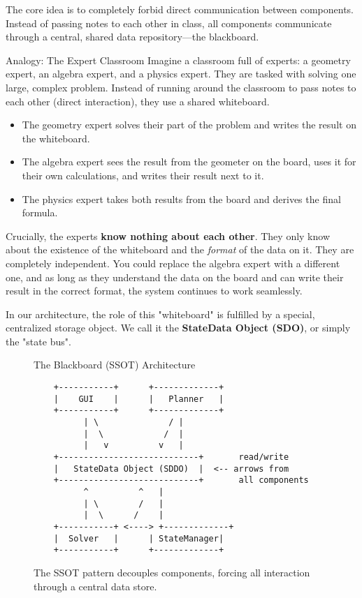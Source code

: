 The core idea is to completely forbid direct communication between components. Instead of passing notes to each other in class, all components communicate through a central, shared data repository—the blackboard.

\begin{tipbox}{Analogy: The Expert Classroom}
Imagine a classroom full of experts: a geometry expert, an algebra expert, and a physics expert. They are tasked with solving one large, complex problem. Instead of running around the classroom to pass notes to each other (direct interaction), they use a shared whiteboard.
\begin{itemize}
    \item The geometry expert solves their part of the problem and writes the result on the whiteboard.
    \item The algebra expert sees the result from the geometer on the board, uses it for their own calculations, and writes their result next to it.
    \item The physics expert takes both results from the board and derives the final formula.
\end{itemize}
Crucially, the experts \textbf{know nothing about each other}. They only know about the existence of the whiteboard and the \textit{format} of the data on it. They are completely independent. You could replace the algebra expert with a different one, and as long as they understand the data on the board and can write their result in the correct format, the system continues to work seamlessly.
\end{tipbox}

In our architecture, the role of this "whiteboard" is fulfilled by a special, centralized storage object. We call it the \textbf{StateData Object (SDO)}, or simply the "state bus".

\newpage
\begin{figure}[h!]
    \centering
    \begin{infobox}{The Blackboard (SSOT) Architecture} %
       
        \begin{verbatim}
    +-----------+      +-------------+
    |    GUI    |      |   Planner   |
    +-----------+      +-------------+
          | \              / |
          |  \            /  |
          |   v          v   |
    +----------------------------+       read/write 
    |   StateData Object (SDDO)  |  <-- arrows from 
    +----------------------------+       all components
          ^          ^   |
          | \        /   |
          |  \      /    |
    +-----------+ <----> +-------------+
    |  Solver   |      | StateManager|
    +-----------+      +-------------+
        \end{verbatim}
    \end{infobox}
    \caption{The SSOT pattern decouples components, forcing all interaction through a central data store.}
    \label{fig:ssot_architecture}
\end{figure}

